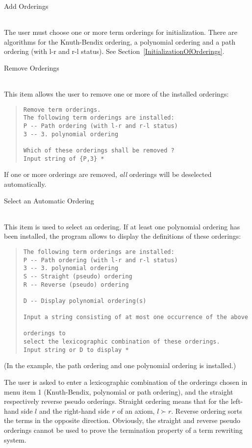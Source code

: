 \begin{enumerate}
{\bf \item{Add Orderings}}\\
The user must choose one or more term orderings for initialization.
There are algorithms for the Knuth-Bendix ordering, a
polynomial ordering and a path ordering (with l-r and r-l status).
See Section~\ref{InitializationOfOrderings}.


{\bf \item{Remove Orderings}}\\
This item allows the user to remove one or more of the installed
orderings:

\begin{quote}
\begin{verbatim}
Remove term orderings.
The following term orderings are installed:
P -- Path ordering (with l-r and r-l status)
3 -- 3. polynomial ordering

Which of these orderings shall be removed ?
Input string of {P,3} *
\end{verbatim}
\end{quote}

If one or more orderings are removed, {\em all} orderings will be deselected
automatically.

{\bf \item{Select an Automatic Ordering}}\\
This item is used to select an ordering. If at least one polynomial
ordering has been installed, the program allows to display the definitions
of these orderings:

\begin{quote}
\begin{verbatim}
The following term orderings are installed:
P -- Path ordering (with l-r and r-l status)
3 -- 3. polynomial ordering
S -- Straight (pseudo) ordering
R -- Reverse (pseudo) ordering

D -- Display polynomial ordering(s)

Input a string consisting of at most one occurrence of the above
                                                             orderings to
select the lexicographic combination of these orderings.
Input string or D to display *
\end{verbatim}
\end{quote}

(In the example, the path ordering and one polynomial ordering
is installed.)

The user is asked to
enter a lexicographic combination of the orderings chosen in 
menu item 1 (Knuth-Bendix,
polynomial or path ordering), and the straight respectively reverse
pseudo orderings.
Straight ordering means that for the left-hand side
$l$ and the right-hand side $r$ of an axiom, $l \succ r$.
Reverse ordering sorts the terms in the opposite direction.
Obviously, the straight and reverse pseudo orderings cannot
be used to prove the termination property of a term rewriting
system.


\end{enumerate}
